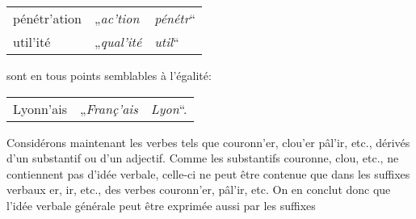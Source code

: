 {    \begin{center}
      \begin{tabular}[t]{l@{ = }l@{ [espèce] }l}
        \textup{pénétr'ation} &  „\emph{ac'tion} & \emph{pénétr}“\\
        \textup{util'ité} & „\emph{qual'ité} & \emph{util}“
      \end{tabular}
    \end{center}
    
    \noindent
    sont en tous points semblables à l’égalité:

    \begin{center}
      \begin{tabular}[t]{l@{ = }l@{ [espèce] }l}
        \textup{Lyonn'ais} & „\emph{Franç'ais} & \emph{Lyon}“.
      \end{tabular}
    \end{center}

    Considérons maintenant les verbes tels que \textup{couronn'er},
    \textup{clou'er} \textup{pâl'ir}, etc., dérivés d’un substantif ou
    d’un adjectif. Comme les substantifs \textup{couronne},
    \textup{clou}, etc., ne contiennent pas d’idée verbale, celle-ci
    ne peut être contenue que dans les suffixes verbaux \textup{er},
    \textup{ir}, etc., des verbes \textup{couronn'er},
    \textup{pâl'ir}, etc. On en conclut donc que l’idée verbale
    générale peut être exprimée aussi par les suffixes
  }
  
